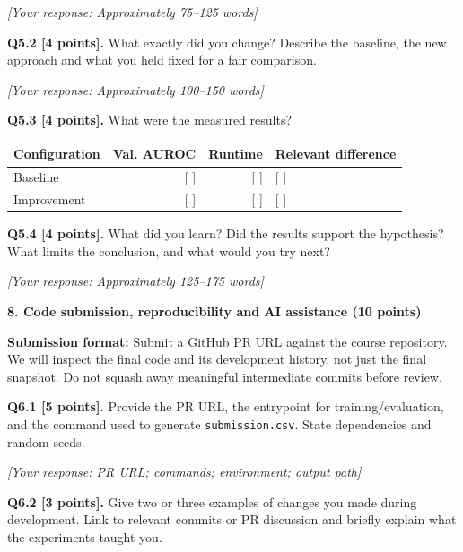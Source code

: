 \documentclass[11pt,letterpaper]{article}
\begin{document}
\textit{[Your response: Approximately 75--125 words]}

\vspace{6pt}
\textbf{Q5.2 [4 points].} What exactly did you change? Describe the baseline, the new approach and what you held fixed for a fair comparison.

\textit{[Your response: Approximately 100--150 words]}

\vspace{6pt}
\textbf{Q5.3 [4 points].} What were the measured results?

\vspace{2pt}
\begin{tabularx}{\textwidth}{@{}lrrX@{}}
\toprule
\textbf{Configuration} & \textbf{Val. AUROC} & \textbf{Runtime} & \textbf{Relevant difference} \\
\midrule
Baseline & [ ] & [ ] & [ ] \\
Improvement & [ ] & [ ] & [ ] \\
\bottomrule
\end{tabularx}

\vspace{6pt}
\textbf{Q5.4 [4 points].} What did you learn? Did the results support the hypothesis? What limits the conclusion, and what would you try next?

\textit{[Your response: Approximately 125--175 words]}

\vspace{12pt}
{\large\textbf{8. Code submission, reproducibility and AI assistance (10 points)}}
\vspace{2pt}

\textbf{Submission format:} Submit a GitHub PR URL against the course repository. We will inspect the final code and its development history, not just the final snapshot. Do not squash away meaningful intermediate commits before review.

\vspace{6pt}
\textbf{Q6.1 [5 points].} Provide the PR URL, the entrypoint for training/evaluation, and the command used to generate \texttt{submission.csv}. State dependencies and random seeds.

\textit{[Your response: PR URL; commands; environment; output path]}

\vspace{6pt}
\textbf{Q6.2 [3 points].} Give two or three examples of changes you made during development. Link to relevant commits or PR discussion and briefly explain what the experiments taught you.
\end{document}
